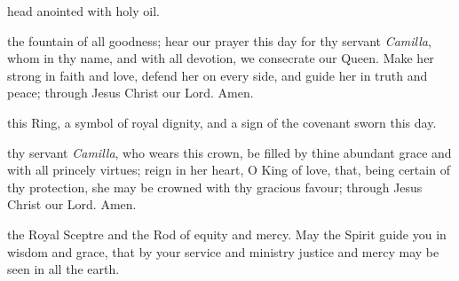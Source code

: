 {\vfill 







 head anointed with holy oil.

\vfill 



 the fountain of all goodness;
hear our prayer this day for thy servant \textit{Camilla},
whom in thy name, and with all devotion,
we consecrate our Queen.
Make her strong in faith and love,
defend her on every side,
and guide her in truth and peace;
through Jesus Christ our Lord. Amen.


\vfill 





 this Ring, a symbol of royal dignity, and a sign of the covenant
sworn this day.


\clearpage
{}



 thy servant \textit{Camilla}, who wears this crown, be filled by thine abundant
grace and with all princely virtues; reign in her heart, O King of love, that,
being certain of thy protection, she may be crowned with thy gracious
favour; through Jesus Christ our Lord. Amen.

\vfill 






 the Royal Sceptre and the Rod of equity and mercy. May the Spirit
guide you in wisdom and grace, that by your service and ministry justice
and mercy may be seen in all the earth.

}
